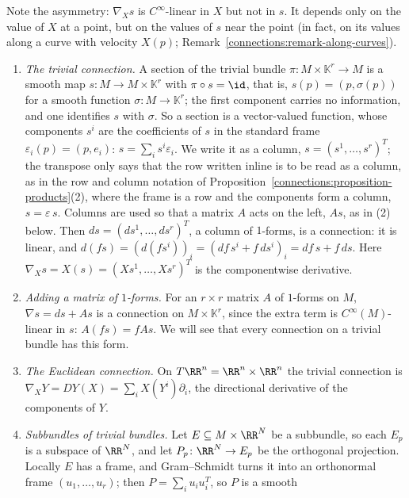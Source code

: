Note the asymmetry: $\nabla_Xs$ is $C^\infty$-linear in $X$ but not in $s$. It depends only on the value of $X$ at a point, but on the values of $s$ near the point (in fact, on
its values along a curve with velocity $X(p)$; Remark~\ref{connections:remark-along-curves}).

\begin{example}\label{connections:example-connections}
\begin{enumerate}
\item \emph{The trivial connection.} A section of the trivial bundle $\pi \colon M \times \mathbb{K}^r \to M$ is a smooth map $s \colon M \to M \times \mathbb{K}^r$ with $\pi \circ s = \id$, that
is, $s(p) = (p, \sigma(p))$ for a smooth function $\sigma \colon M \to \mathbb{K}^r$; the first component carries no information, and one identifies $s$ with $\sigma$. So a section is a vector-valued
function, whose components $s^i$ are the coefficients of $s$ in the standard frame $\varepsilon_i(p) = (p, e_i)$: $s = \sum_is^i\varepsilon_i$. We write it as a column,
$s = (s^1, \ldots, s^r)^T$; the transpose only says that the row written inline is to be read as a column, as in the row and column notation of
Proposition~\ref{connections:proposition-products}(2), where the frame is a row and the components form a column, $s = \varepsilon\,s$. Columns are used so that a matrix $A$ acts on the left, $As$, as in (2)
below. Then $ds = (ds^1, \ldots, ds^r)^T$, a column of $1$-forms, is a connection: it is linear, and $d(fs) = (d(fs^i))_i = (df\,s^i + f\,ds^i)_i = df\,s + f\,ds$. Here $\nabla_Xs = X(s) = (Xs^1, \ldots, Xs^r)^T$
is the componentwise derivative.
\item \emph{Adding a matrix of $1$-forms.} For an $r \times r$ matrix $A$ of $1$-forms on $M$, $\nabla s = ds + As$ is a connection on $M \times \mathbb{K}^r$, since the extra term
is $C^\infty(M)$-linear in $s$: $A(fs) = fAs$. We will see that every connection on a trivial bundle has this form.
\item \emph{The Euclidean connection.} On $T\RR^n = \RR^n \times \RR^n$ the trivial connection is $\nabla_XY = DY(X) = \sum_iX(Y^i)\partial_i$, the directional derivative of
the components of $Y$.
\item \emph{Subbundles of trivial bundles.} Let $E \subseteq M \times \RR^N$ be a subbundle, so each $E_p$ is a subspace of $\RR^N$, and let $P_p \colon \RR^N \to E_p$ be the
orthogonal projection. Locally $E$ has a frame, and Gram--Schmidt turns it into an orthonormal frame $(u_1, \ldots, u_r)$; then $P = \sum_iu_iu_i^T$, so $P$ is a smooth

\end{enumerate}
\end{example}
